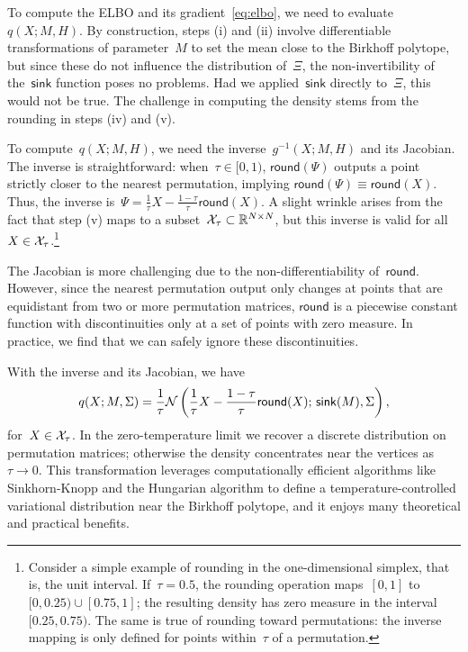 \documentclass[twoside]{article}
\begin{document}
To compute the ELBO and its gradient~\eqref{eq:elbo}, we need to
evaluate~$q(X; M, H)$.  By construction, steps (i) and (ii) involve
differentiable transformations of parameter~$M$ to set the mean close
to the Birkhoff polytope, but since these do not influence the
distribution of~$\Xi$, the non-invertibility of
the~$\mathsf{sink}$ function poses no problems.  Had
we applied~$\mathsf{sink}$ directly to~$\Xi$, this would not be true.
The challenge in computing the density stems from the rounding in
steps (iv) and (v).

To compute~$q(X; M, H)$, we need the inverse~$g^{-1}(X; M, H)$ and its
Jacobian.  The inverse is straightforward: when~${\tau \in [0,1)}$,
$\mathsf{round}(\Psi)$ outputs a point strictly closer to the nearest
permutation, implying
${\mathsf{round}(\Psi) \equiv \mathsf{round}(X)}$.  Thus, the inverse
is~${\Psi = \tfrac{1}{\tau}X - \tfrac{1-\tau}{\tau}
  \mathsf{round}(X)}$.  A slight wrinkle arises from the fact that
step (v) maps to a subset~$\mathcal{X}_\tau \subset \mathbb{R}^{N \times N}$, but
this inverse is valid for all~$X \in \mathcal{X}_\tau$.\footnote{Consider a
  simple example of rounding in the one-dimensional simplex, that is,
  the unit interval.  If~$\tau = 0.5$, the rounding operation
  maps~$[0,1]$ to~${[0,0.25) \cup [0.75, 1]}$; the resulting density
  has zero measure in the interval~$[0.25, 0.75)$.  The same is true
  of rounding toward permutations: the inverse mapping is only defined
  for points within~$\tau$ of a permutation. }

The Jacobian is more challenging due to the non-differentiability
of~$\mathsf{round}$. However, since the nearest permutation output
only changes at points that are equidistant from two or more
permutation matrices, $\mathsf{round}$ is a piecewise constant
function with discontinuities only at a set of points with
zero measure. In practice, we find that we can safely ignore these
discontinuities.

With the inverse and its Jacobian, we have
\begin{align*}
  q(X; M, \Sigma) = 
  \frac{1}{\tau} \mathcal{N} \left( \frac{1}{\tau}X -\frac{1-\tau}{\tau} \mathsf{round}(X); \, \mathsf{sink}(M), \Sigma \right),
\end{align*}
for~${X \in \mathcal{X}_\tau}$.
In the zero-temperature limit we recover a discrete
distribution on permutation matrices; otherwise the density
concentrates near the vertices as~${\tau \to 0}$.  This
transformation leverages computationally efficient algorithms
like Sinkhorn-Knopp and the Hungarian algorithm to define a
temperature-controlled variational distribution near the
Birkhoff polytope, and it enjoys many theoretical and practical
benefits.
\end{document}
